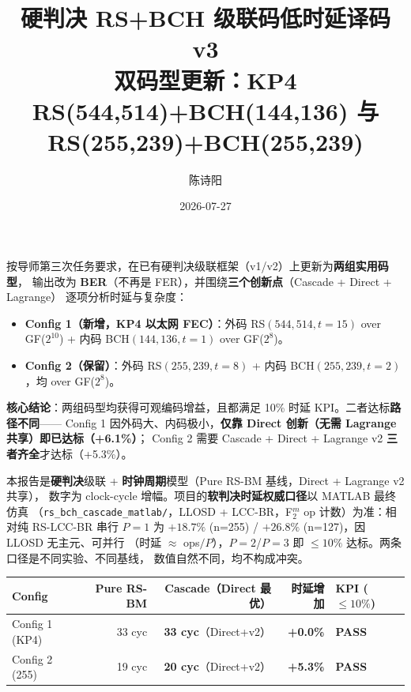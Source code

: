 \documentclass[11pt,a4paper]{article}
\title{硬判决 RS+BCH 级联码低时延译码 v3\\
       {\large 双码型更新：KP4 RS(544,514)+BCH(144,136) 与 RS(255,239)+BCH(255,239)}}
\author{陈诗阳}
\date{2026-07-27}
\begin{document}
\maketitle

\begin{keybox}[title=\textbf{v3 更新摘要}]
按导师第三次任务要求，在已有硬判决级联框架（v1/v2）上更新为\textbf{两组实用码型}，
输出改为 \textbf{BER}（不再是 FER），并围绕\textbf{三个创新点}（Cascade + Direct + Lagrange）
逐项分析时延与复杂度：
\begin{itemize}[leftmargin=1.5em, itemsep=1pt, topsep=2pt]
\item \textbf{Config 1（新增，KP4 以太网 FEC）}：外码 RS$(544,514,t{=}15)$ over GF($2^{10}$)
      + 内码 BCH$(144,136,t{=}1)$ over GF($2^{8}$)。
\item \textbf{Config 2（保留）}：外码 RS$(255,239,t{=}8)$ + 内码 BCH$(255,239,t{=}2)$，均 over GF($2^{8}$)。
\end{itemize}

\textbf{核心结论}：两组码型均获得可观编码增益，且都满足 10\% 时延 KPI。二者达标\textbf{路径不同}——
Config 1 因外码大、内码极小，\textbf{仅靠 Direct 创新（无需 Lagrange 共享）即已达标（+6.1\%）}；
Config 2 需要 Cascade + Direct + Lagrange v2 \textbf{三者齐全}才达标（+5.3\%）。

\begin{keybox}[title=\textbf{口径说明：本报告 vs 项目权威软判仿真}]
本报告是\textbf{硬判决}级联 + \textbf{时钟周期}模型（Pure RS-BM 基线，Direct + Lagrange v2 共享），
数字为 clock-cycle 增幅。项目的\textbf{软判决时延权威口径}以 MATLAB 最终仿真
（\texttt{rs\_bch\_cascade\_matlab/}，LLOSD + LCC-BR，F$_2^m$ op 计数）为准：相对纯 RS-LCC-BR
串行 $P{=}1$ 为 $+18.7\%$ (n=255) / $+26.8\%$ (n=127)，因 LLOSD 无主元、可并行
（时延 $\approx$ ops$/P$），$P{=}2$/$P{=}3$ 即 $\leq 10\%$ 达标。两条口径是不同实验、不同基线，
数值自然不同，均不构成冲突。
\end{keybox}

\begin{center}
\begin{tabular}{lrrrl}
\toprule
Config & Pure RS-BM & Cascade（Direct 最优）& 时延增加 & KPI ($\leq 10\%$) \\
\midrule
Config 1 (KP4) & 33 cyc & \textbf{33 cyc}（Direct+v2）& \textbf{+0.0\%} & \textbf{PASS} \\
Config 2 (255) & 19 cyc & \textbf{20 cyc}（Direct+v2）& \textbf{+5.3\%} & \textbf{PASS} \\
\bottomrule
\end{tabular}
\end{center}
\end{keybox}
\end{document}
